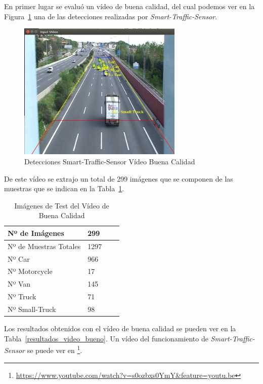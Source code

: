 En primer lugar se evaluó un vídeo de buena calidad, del cual podemos ver en la Figura~\ref{fig.video_buena_calidad} una de las detecciones realizadas por \textit{Smart-Traffic-Sensor}.

\begin{figure}[H] 
\begin{center}
	\includegraphics[width=0.7\textwidth]{figures/Experimentos/sts_buena.png}
   \caption{Detecciones Smart-Traffic-Sensor Vídeo Buena Calidad}
	\label{fig.video_buena_calidad}
\end{center}
\end{figure}

De este vídeo se extrajo un total de 299 imágenes que se componen de las muestras que se indican en la Tabla~\ref{tabla_video_bueno}.

\begin{table}[H] 
\begin{center}
\begin{tabular}{|l|l|l|l|}
\hline
Nº de Imágenes  & 299 \\
\hline \hline
Nº de Muestras Totales & 1297\\ \hline
Nº Car & 966 \\ \hline
Nº Motorcycle & 17 \\ \hline
Nº Van & 145 \\ \hline
Nº Truck & 71 \\ \hline
Nº Small-Truck & 98 \\ \hline
\end{tabular}
\caption{Imágenes de Test del Vídeo de Buena Calidad}
\label{tabla_video_bueno}
\end{center}
\end{table}

Los resultados obtenidos con el vídeo de buena calidad se pueden ver en la Tabla~\ref{resultados_video_bueno}. Un vídeo del funcionamiento de \textit{Smart-Traffic-Sensor} se puede ver en \footnote{\url{https://www.youtube.com/watch?v=s0ozbxs0YmY&feature=youtu.be}}.

